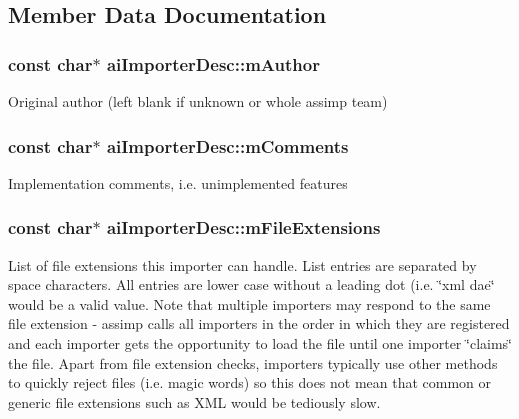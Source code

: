 \subsection{Member Data Documentation}
\subsubsection[{\texorpdfstring{m\+Author}{mAuthor}}]{\setlength{\rightskip}{0pt plus 5cm}const char$\ast$ ai\+Importer\+Desc\+::m\+Author}\hypertarget{structai_importer_desc_a8e050453324b1e855701c7c082c1b24b}{}\label{structai_importer_desc_a8e050453324b1e855701c7c082c1b24b}
Original author (left blank if unknown or whole assimp team) 
\subsubsection[{\texorpdfstring{m\+Comments}{mComments}}]{\setlength{\rightskip}{0pt plus 5cm}const char$\ast$ ai\+Importer\+Desc\+::m\+Comments}\hypertarget{structai_importer_desc_a2d8ad562f6c18ee9e8bfdb2da4871118}{}\label{structai_importer_desc_a2d8ad562f6c18ee9e8bfdb2da4871118}
Implementation comments, i.\+e. unimplemented features 
\subsubsection[{\texorpdfstring{m\+File\+Extensions}{mFileExtensions}}]{\setlength{\rightskip}{0pt plus 5cm}const char$\ast$ ai\+Importer\+Desc\+::m\+File\+Extensions}\hypertarget{structai_importer_desc_a074bd688ffd15d7f4df32e794111a413}{}\label{structai_importer_desc_a074bd688ffd15d7f4df32e794111a413}
List of file extensions this importer can handle. List entries are separated by space characters. All entries are lower case without a leading dot (i.\+e. \char`\"{}xml dae\char`\"{} would be a valid value. Note that multiple importers may respond to the same file extension -\/ assimp calls all importers in the order in which they are registered and each importer gets the opportunity to load the file until one importer \char`\"{}claims\char`\"{} the file. Apart from file extension checks, importers typically use other methods to quickly reject files (i.\+e. magic words) so this does not mean that common or generic file extensions such as X\+ML would be tediously slow. 
